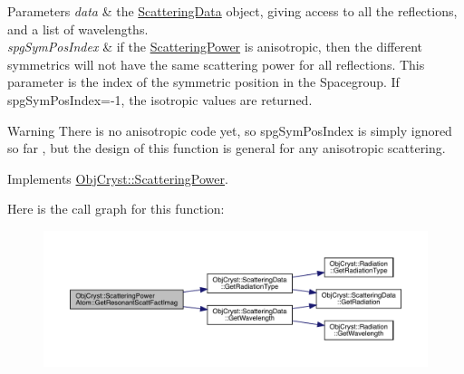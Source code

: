 \begin{DoxyParams}{Parameters}
{\em data} & the \mbox{\hyperlink{class_obj_cryst_1_1_scattering_data}{Scattering\+Data}} object, giving access to all the reflections, and a list of wavelengths. \\
\hline
{\em spg\+Sym\+Pos\+Index} & if the \mbox{\hyperlink{class_obj_cryst_1_1_scattering_power}{Scattering\+Power}} is anisotropic, then the different symmetrics will not have the same scattering power for all reflections. This parameter is the index of the symmetric position in the Spacegroup. If spg\+Sym\+Pos\+Index=-\/1, the isotropic values are returned. \\
\hline
\end{DoxyParams}
\begin{DoxyWarning}{Warning}
There is no anisotropic code yet, so spg\+Sym\+Pos\+Index is simply ignored so far , but the design of this function is general for any anisotropic scattering. 
\end{DoxyWarning}


Implements \mbox{\hyperlink{class_obj_cryst_1_1_scattering_power_a9bc5d86bf76116f645b43d46f2a9771c}{Obj\+Cryst\+::\+Scattering\+Power}}.

Here is the call graph for this function\+:
\nopagebreak
\begin{figure}[H]
\begin{center}
\leavevmode
\includegraphics[width=350pt]{class_obj_cryst_1_1_scattering_power_atom_a42db6378fdd8e3fbfae31b3f4dd5bb17_cgraph}
\end{center}
\end{figure}
\mbox{\label{class_obj_cryst_1_1_scattering_power_atom_a38d48cd95ad51e9d83bfeb59988492c1}} 
